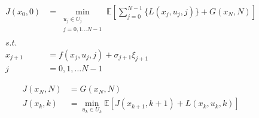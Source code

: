 \documentclass[varwidth]{standalone}
\begin{document}
\begin{minipage}{\linewidth}
    \begin{align}
        J(x_0, 0) &= \min_{
            \substack{
                u_j \in U_j \\
                j = 0, 1 \dots N-1 \\
            }
        }
        \mathbb{E} \left[ \sum_{j=0}^{N-1} \{L(x_j, u_j, j)\} + G(x_N, N)\right] \nonumber\\
        s.t. &{} \\
        x_{j+1} &= f(x_j, u_j, j) + \sigma_{j+1}\xi_{j+1} \nonumber\\
        j &= 0, 1, \dots N-1 \nonumber
    \end{align}
\end{minipage}

\begin{minipage}{\linewidth}
    \begin{align}
        J(x_N, N) &= G(x_N, N)  \\
        J(x_k, k) &= \min_{u_k \in U_k} \mathbb{E} \left[ 
            J(x_{k+1}, k+1) + L(x_k, u_k, k) 
        \right]
    \end{align}
\end{minipage}
\end{document}
